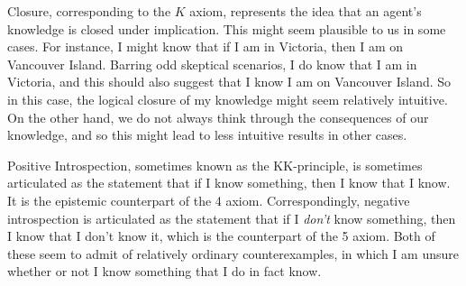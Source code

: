 \documentclass[../../../include/open-logic-section]{subfiles}
\begin{document}
Closure, corresponding to the $K$ axiom, represents the idea that an agent's knowledge is closed under implication. This might seem plausible to us in some cases. For instance, I might know that if I am in Victoria, then I am on Vancouver Island. Barring odd skeptical scenarios, I do know that I am in Victoria, and this should also suggest that I know I am on Vancouver Island. So in this case, the logical closure of my knowledge might seem relatively intuitive. On the other hand, we do not always think through the consequences of our knowledge, and so this might lead to less intuitive results in other cases.

Positive Introspection, sometimes known as the KK-principle, is sometimes articulated as the statement that if I know something, then I know that I know. It is the epistemic counterpart of the 4 axiom. Correspondingly, negative introspection is articulated as the statement that if I \emph{don't} know something, then I know that I don't know it, which is the counterpart of the 5 axiom. Both of these seem to admit of relatively ordinary counterexamples, in which I am unsure whether or not I know something that I do in fact know. 
\end{document}
